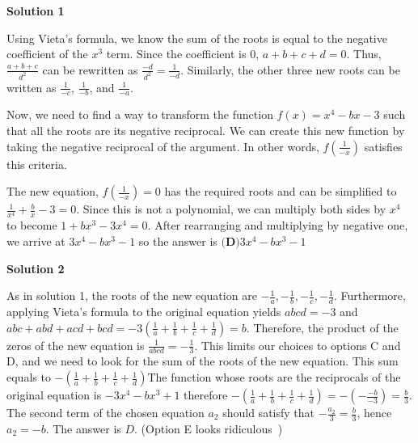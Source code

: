 \begin{enumerate}
\textbf{Solution 1}

Using Vieta's formula, we know the sum of the roots is equal to the negative coefficient of the $x^3$ term. Since the coefficient is 0, $a+b+c+d=0$. Thus, $\frac{a+b+c}{d^2}$ can be rewritten as $\frac{-d}{d^2}=\frac{1}{-d}$. Similarly, the other three new roots can be written as $\frac{1}{-c}$, $\frac{1}{-b}$, and $\frac{1}{-a}$.

 Now, we need to find a way to transform the function $f(x)=x^4-bx-3$ such that all the roots are its negative reciprocal. We can create this new function by taking the negative reciprocal of the argument. In other words, $f(\frac{1}{-x})$ satisfies this criteria.

 The new equation, $f(\frac{1}{-x})=0$ has the required roots and can be simplified to $\frac{1}{x^4}+\frac{b}{x}-3=0$. Since this is not a polynomial, we can multiply both sides by $x^4$ to become $1+bx^3-3x^4=0$. After rearranging and multiplying by negative one, we arrive at $3x^4-bx^3-1$ so the answer is $\boxed{\textbf{(D)} 3x^4-bx^3-1}$




\textbf{Solution 2}

As in solution 1, the roots of the new equation are $-\frac{1}{a}, -\frac{1}{b}, -\frac{1}{c},-\frac{1}{d}$. Furthermore, applying Vieta’s formula to the original equation yields $abcd=-3$ and $abc+abd+acd+bcd=-3(\frac{1}{a}+\frac{1}{b}+\frac{1}{c}+\frac{1}{d})=b$. Therefore, the product of the zeros of the new equation is $\frac{1}{abcd}=-\frac{1}{3}$. This limits our choices to options C and D, and we need to look for the sum of the roots of the new equation. This sum equals to $-(\frac{1}{a}+\frac{1}{b}+\frac{1}{c}+\frac{1}{d})$The function whose roots are the reciprocals of the original equation is $-3x^4-bx^3+1$ therefore $-(\frac{1}{a}+\frac{1}{b}+\frac{1}{c}+\frac{1}{d})=-(-\frac{-b}{-3})=\frac{b}{3}$. The second term of the chosen equation $a_{2}$ should satisfy that $-\frac{a_{2}}{3}=\frac{b}{3}$, hence $a_{2}=-b$. The answer is $D$. (Option E looks ridiculous~)

 


\end{enumerate}